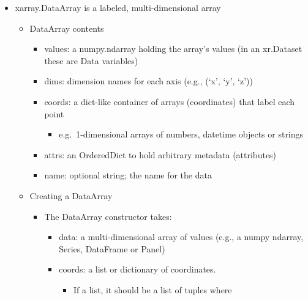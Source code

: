 \documentclass[11pt]{article}
\providecommand{\tightlist}{%
      \setlength{\itemsep}{0pt}\setlength{\parskip}{0pt}}
\begin{document}
\begin{itemize}
\tightlist
\item
  xarray.DataArray is a labeled, multi-dimensional array

  \begin{itemize}
  \tightlist
  \item
    DataArray contents

    \begin{itemize}
    \tightlist
    \item
      values: a numpy.ndarray holding the array's values (in an
      xr.Dataset these are Data variables)
    \item
      dims: dimension names for each axis (e.g., (`x', `y', `z'))
    \item
      coords: a dict-like container of arrays (coordinates) that label
      each point

      \begin{itemize}
      \tightlist
      \item
        e.g.~1-dimensional arrays of numbers, datetime objects or
        strings
      \end{itemize}
    \item
      attrs: an OrderedDict to hold arbitrary metadata (attributes)
    \item
      name: optional string; the name for the data
    \end{itemize}
  \item
    Creating a DataArray

    \begin{itemize}
    \tightlist
    \item
      The DataArray constructor takes:

      \begin{itemize}
      \tightlist
      \item
        data: a multi-dimensional array of values (e.g., a numpy
        ndarray, Series, DataFrame or Panel)
      \item
        coords: a list or dictionary of coordinates.

        \begin{itemize}
        \tightlist
        \item
          If a list, it should be a list of tuples where


\end{itemize}
\end{itemize}
\end{itemize}
\end{itemize}
\end{itemize}
\end{document}
